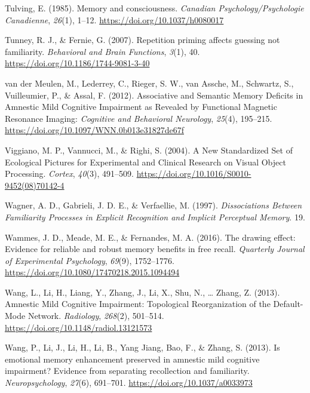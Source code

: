 \documentclass[
  11pt,
]{article}
\begin{document}
\leavevmode\hypertarget{ref-tulving1985}{}%
Tulving, E. (1985). Memory and consciousness. \emph{Canadian
Psychology/Psychologie Canadienne}, \emph{26}(1), 1--12.
\url{https://doi.org/10.1037/h0080017}

\leavevmode\hypertarget{ref-tunney2007}{}%
Tunney, R. J., \& Fernie, G. (2007). Repetition priming affects guessing
not familiarity. \emph{Behavioral and Brain Functions}, \emph{3}(1), 40.
\url{https://doi.org/10.1186/1744-9081-3-40}

\leavevmode\hypertarget{ref-vandermeulen2012}{}%
van der Meulen, M., Lederrey, C., Rieger, S. W., van Assche, M.,
Schwartz, S., Vuilleumier, P., \& Assal, F. (2012). Associative and
Semantic Memory Deficits in Amnestic Mild Cognitive Impairment as
Revealed by Functional Magnetic Resonance Imaging: \emph{Cognitive and
Behavioral Neurology}, \emph{25}(4), 195--215.
\url{https://doi.org/10.1097/WNN.0b013e31827de67f}

\leavevmode\hypertarget{ref-viggiano2004}{}%
Viggiano, M. P., Vannucci, M., \& Righi, S. (2004). A New Standardized
Set of Ecological Pictures for Experimental and Clinical Research on
Visual Object Processing. \emph{Cortex}, \emph{40}(3), 491--509.
\url{https://doi.org/10.1016/S0010-9452(08)70142-4}

\leavevmode\hypertarget{ref-wagner1997}{}%
Wagner, A. D., Gabrieli, J. D. E., \& Verfaellie, M. (1997).
\emph{Dissociations Between Familiarity Processes in Explicit
Recognition and Implicit Perceptual Memory}. 19.

\leavevmode\hypertarget{ref-wammes2016}{}%
Wammes, J. D., Meade, M. E., \& Fernandes, M. A. (2016). The drawing
effect: Evidence for reliable and robust memory benefits in free recall.
\emph{Quarterly Journal of Experimental Psychology}, \emph{69}(9),
1752--1776. \url{https://doi.org/10.1080/17470218.2015.1094494}

\leavevmode\hypertarget{ref-wang2013}{}%
Wang, L., Li, H., Liang, Y., Zhang, J., Li, X., Shu, N., \ldots{} Zhang,
Z. (2013). Amnestic Mild Cognitive Impairment: Topological
Reorganization of the Default-Mode Network. \emph{Radiology},
\emph{268}(2), 501--514. \url{https://doi.org/10.1148/radiol.13121573}

\leavevmode\hypertarget{ref-wang2013a}{}%
Wang, P., Li, J., Li, H., Li, B., Yang Jiang, Bao, F., \& Zhang, S.
(2013). Is emotional memory enhancement preserved in amnestic mild
cognitive impairment? Evidence from separating recollection and
familiarity. \emph{Neuropsychology}, \emph{27}(6), 691--701.
\url{https://doi.org/10.1037/a0033973}
\end{document}
